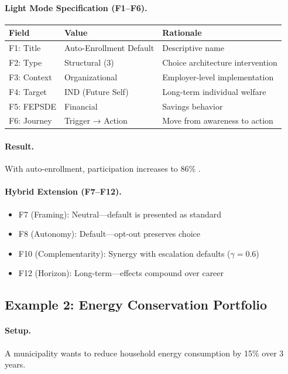\paragraph{Light Mode Specification (F1--F6).}
\begin{table}[htbp]
\centering
\small
\begin{tabular}{@{}lll@{}}
\toprule
\textbf{Field} & \textbf{Value} & \textbf{Rationale} \\
\midrule
F1: Title & Auto-Enrollment Default & Descriptive name \\
F2: Type & Structural (3) & Choice architecture intervention \\
F3: Context & Organizational & Employer-level implementation \\
F4: Target & IND (Future Self) & Long-term individual welfare \\
F5: FEPSDE & Financial & Savings behavior \\
F6: Journey & Trigger → Action & Move from awareness to action \\
\bottomrule
\end{tabular}
\end{table}

\paragraph{Result.} With auto-enrollment, participation increases to 86\% \citep{madrian2001}.

\paragraph{Hybrid Extension (F7--F12).}
\begin{itemize}
\item F7 (Framing): Neutral---default is presented as standard
\item F8 (Autonomy): Default---opt-out preserves choice
\item F10 (Complementarity): Synergy with escalation defaults ($\gamma = 0.6$)
\item F12 (Horizon): Long-term---effects compound over career
\end{itemize}

\subsection{Example 2: Energy Conservation Portfolio}

\paragraph{Setup.} A municipality wants to reduce household energy consumption by 15\% over 3 years.

